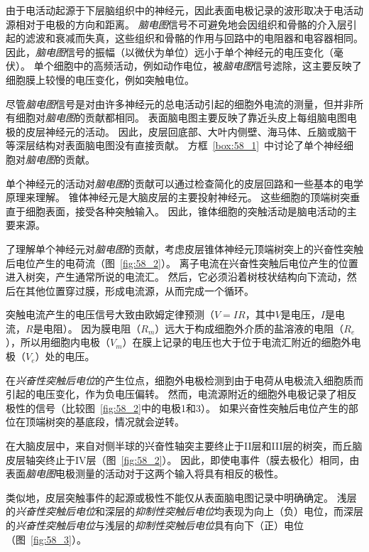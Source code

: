 由于电活动起源于下层脑组织中的神经元，因此表面电极记录的波形取决于电活动源相对于电极的方向和距离。
\textit{脑电图}信号不可避免地会因组织和骨骼的介入层引起的滤波和衰减而失真，这些组织和骨骼的作用与回路中的电阻器和电容器相同。
因此，\textit{脑电图}信号的振幅（以微伏为单位）远小于单个神经元的电压变化（毫伏）。
单个细胞中的高频活动，例如动作电位，被\textit{脑电图}信号滤除，这主要反映了细胞膜上较慢的电压变化，例如突触电位。


尽管\textit{脑电图}信号是对由许多神经元的总电活动引起的细胞外电流的测量，但并非所有细胞对\textit{脑电图}的贡献都相同。
表面脑电图主要反映了靠近头皮上每组脑电图电极的皮层神经元的活动。
因此，皮层回底部、大叶内侧壁、海马体、丘脑或脑干等深层结构对表面脑电图没有直接贡献。
方框~\ref{box:58_1}~中讨论了单个神经细胞对\textit{脑电图}的贡献。


\begin{proposition}[单个神经元对脑电图的贡献] \label{box:58_1}
	
	\quad \quad 单个神经元的活动对\textit{脑电图}的贡献可以通过检查简化的皮层回路和一些基本的电学原理来理解。
	锥体神经元是大脑皮层的主要投射神经元。
	这些细胞的顶端树突垂直于细胞表面，接受各种突触输入。
	因此，锥体细胞的突触活动是脑电活动的主要来源。
	
	了理解单个神经元对\textit{脑电图}的贡献，考虑皮层锥体神经元顶端树突上的兴奋性突触后电位产生的电荷流（图~\ref{fig:58_2}）。
	离子电流在兴奋性突触后电位产生的位置进入树突，产生通常所说的电流汇。
	然后，它必须沿着树枝状结构向下流动，然后在其他位置穿过膜，形成电流源，从而完成一个循环。
	
	突触电流产生的电压信号大致由欧姆定律预测（$ V=IR $，其中$ V $是电压，$ I $是电流，$ R $是电阻）。
	因为膜电阻（$R_m$）远大于构成细胞外介质的盐溶液的电阻（$ R_e $），所以用细胞内电极（$ V_m $）在膜上记录的电压也大于位于电流汇附近的细胞外电极（$ V_e $）处的电压。
	
	在\textit{兴奋性突触后电位}的产生位点，细胞外电极检测到由于电荷从电极流入细胞质而引起的电压变化，作为负电压偏转。
	然而，电流源附近的细胞外电极记录了相反极性的信号（比较图~\ref{fig:58_2}中的电极1和3）。
	如果兴奋性突触后电位产生的部位在顶端树突的基底段，情况就会逆转。
	
	在大脑皮层中，来自对侧半球的兴奋性轴突主要终止于II层和III层的树突，而丘脑皮层轴突终止于IV层（图~\ref{fig:58_2}）。
	因此，即使电事件（膜去极化）相同，由表面\textit{脑电图}电极测量的活动对于这两个输入将具有相反的极性。
	
	类似地，皮层突触事件的起源或极性不能仅从表面脑电图记录中明确确定。
	浅层的\textit{兴奋性突触后电位}和深层的\textit{抑制性突触后电位}均表现为向上（负）电位，而深层的\textit{兴奋性突触后电位}与浅层的\textit{抑制性突触后电位}具有向下（正）电位（图~\ref{fig:58_3}）。
	
\end{proposition}


